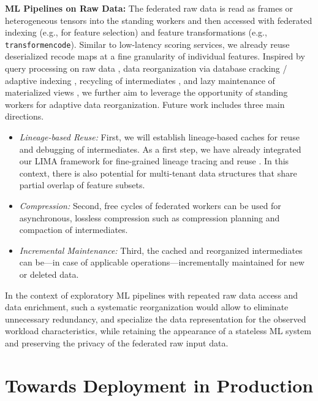 \documentclass[sigconf,screen]{acmart}
\begin{document}
\textbf{ML Pipelines on Raw Data:} The federated raw data is read as frames or heterogeneous tensors \cite{BoehmADGIKLPR20} into the standing workers and then accessed with federated indexing (e.g., for feature selection) and feature transformations (e.g., \texttt{transformencode}). Similar to low-latency scoring services, we already reuse deserialized recode maps at a fine granularity of individual features. Inspired by query processing on raw data \cite{AlagiannisBBIA12,IdreosAJA11,KarpathiotakisA16}, data reorganization via database cracking \cite{IdreosKM07} / adaptive indexing \cite{IdreosMG12}, recycling of intermediates \cite{IvanovaKNG10}, and lazy maintenance of materialized views \cite{ZhouLE07}, we further aim to leverage the opportunity of standing workers for adaptive data reorganization. Future work includes three main directions.
\begin{itemize}
\item \emph{Lineage-based Reuse:} First, we will establish lineage-based caches for reuse \cite{XinMLMSP18,DerakhshanMARM20} and debugging \cite{VartakTMZ18} of intermediates. As a first step, we have already integrated our LIMA framework for fine-grained lineage tracing and reuse \cite{LIMA21}. In this context, there is also potential for multi-tenant data structures that share partial overlap of feature subsets.
\item \emph{Compression:} Second, free cycles of federated workers can be used for asynchronous, lossless compression \cite{ElgoharyBHRR18,LiCZ00NP19} such as compression planning and compaction of intermediates.
\item \emph{Incremental Maintenance:} Third, the cached and reorganized intermediates can be---in case of applicable operations---incrementally maintained \cite{NikolicEK14,Schelter20} for new or deleted data.
\end{itemize}
In the context of exploratory ML pipelines with repeated raw data access and data enrichment, such a systematic reorganization would allow to eliminate unnecessary redundancy, and specialize the data representation for the observed workload characteristics, while retaining the appearance of a stateless ML system and preserving the privacy of the federated raw input data.


\section{Towards Deployment in Production}
\label{sec:deployment}
\end{document}
